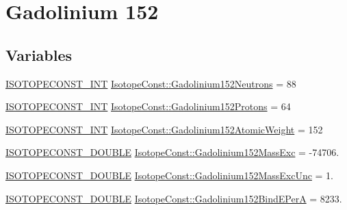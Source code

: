 \hypertarget{group___isotope_const-_gadolinium-_gd152}{}\section{Gadolinium 152}
\label{group___isotope_const-_gadolinium-_gd152}
\subsection*{Variables}
\begin{DoxyCompactItemize}
\item 
\mbox{\hyperlink{group___isotope_const-_macros_ga5f18360b3e99483a35c32d789e62621c}{I\+S\+O\+T\+O\+P\+E\+C\+O\+N\+S\+T\+\_\+\+I\+NT}} \mbox{\hyperlink{group___isotope_const-_gadolinium-_gd152_gae5e37853f2031fd4b4356c2cbf290eab}{Isotope\+Const\+::\+Gadolinium152\+Neutrons}} = 88
\item 
\mbox{\hyperlink{group___isotope_const-_macros_ga5f18360b3e99483a35c32d789e62621c}{I\+S\+O\+T\+O\+P\+E\+C\+O\+N\+S\+T\+\_\+\+I\+NT}} \mbox{\hyperlink{group___isotope_const-_gadolinium-_gd152_ga32cb3648c47a1b4aa50b6609baa4bbb3}{Isotope\+Const\+::\+Gadolinium152\+Protons}} = 64
\item 
\mbox{\hyperlink{group___isotope_const-_macros_ga5f18360b3e99483a35c32d789e62621c}{I\+S\+O\+T\+O\+P\+E\+C\+O\+N\+S\+T\+\_\+\+I\+NT}} \mbox{\hyperlink{group___isotope_const-_gadolinium-_gd152_ga2aafc00486887b64eae83e56dd6a4893}{Isotope\+Const\+::\+Gadolinium152\+Atomic\+Weight}} = 152
\item 
\mbox{\hyperlink{group___isotope_const-_macros_ga8f45a7272ce02c0b4c65c44636ed719a}{I\+S\+O\+T\+O\+P\+E\+C\+O\+N\+S\+T\+\_\+\+D\+O\+U\+B\+LE}} \mbox{\hyperlink{group___isotope_const-_gadolinium-_gd152_ga445e36e7b6e5e2cd8f5eb92031948426}{Isotope\+Const\+::\+Gadolinium152\+Mass\+Exc}} = -\/74706.
\item 
\mbox{\hyperlink{group___isotope_const-_macros_ga8f45a7272ce02c0b4c65c44636ed719a}{I\+S\+O\+T\+O\+P\+E\+C\+O\+N\+S\+T\+\_\+\+D\+O\+U\+B\+LE}} \mbox{\hyperlink{group___isotope_const-_gadolinium-_gd152_ga83eadc5251a670b70bc33082cf13025d}{Isotope\+Const\+::\+Gadolinium152\+Mass\+Exc\+Unc}} = 1.
\item 
\mbox{\hyperlink{group___isotope_const-_macros_ga8f45a7272ce02c0b4c65c44636ed719a}{I\+S\+O\+T\+O\+P\+E\+C\+O\+N\+S\+T\+\_\+\+D\+O\+U\+B\+LE}} \mbox{\hyperlink{group___isotope_const-_gadolinium-_gd152_gae005b865f78eb1514aae42f5742a11f9}{Isotope\+Const\+::\+Gadolinium152\+Bind\+E\+PerA}} = 8233.

\end{DoxyCompactItemize}
